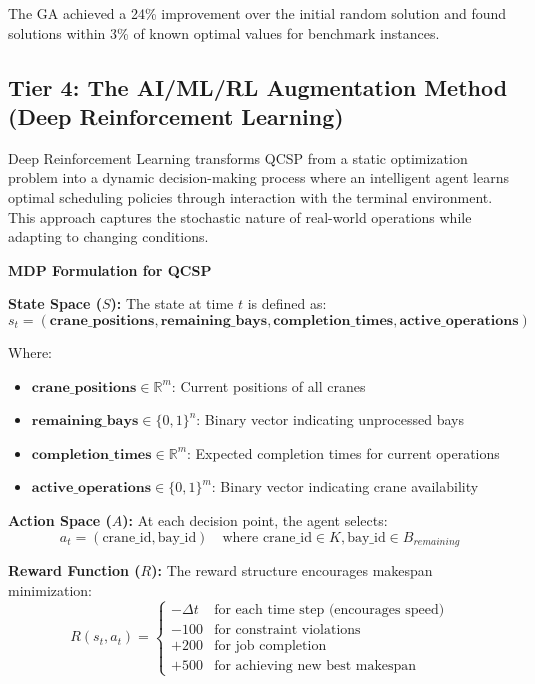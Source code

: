 \documentclass{article}
\begin{document}
The GA achieved a 24\% improvement over the initial random solution and found solutions within 3\% of known optimal values for benchmark instances.

\subsection{Tier 4: The AI/ML/RL Augmentation Method (Deep Reinforcement Learning)}

Deep Reinforcement Learning transforms QCSP from a static optimization problem into a dynamic decision-making process where an intelligent agent learns optimal scheduling policies through interaction with the terminal environment. This approach captures the stochastic nature of real-world operations while adapting to changing conditions.

\textbf{MDP Formulation for QCSP}

\textbf{State Space ($S$):} The state at time $t$ is defined as:
\begin{equation}
s_t = (\mathbf{crane\_positions}, \mathbf{remaining\_bays}, \mathbf{completion\_times}, \mathbf{active\_operations})
\end{equation}

Where:
\begin{itemize}
\item $\mathbf{crane\_positions} \in \mathbb{R}^m$: Current positions of all cranes
\item $\mathbf{remaining\_bays} \in \{0,1\}^n$: Binary vector indicating unprocessed bays
\item $\mathbf{completion\_times} \in \mathbb{R}^m$: Expected completion times for current operations
\item $\mathbf{active\_operations} \in \{0,1\}^m$: Binary vector indicating crane availability
\end{itemize}

\textbf{Action Space ($A$):} At each decision point, the agent selects:
\begin{equation}
a_t = (\text{crane\_id}, \text{bay\_id}) \quad \text{where crane\_id} \in K, \text{bay\_id} \in B_{remaining}
\end{equation}

\textbf{Reward Function ($R$):} The reward structure encourages makespan minimization:
\begin{equation}
R(s_t, a_t) = \begin{cases}
-\Delta t & \text{for each time step (encourages speed)} \\
-100 & \text{for constraint violations} \\
+200 & \text{for job completion} \\
+500 & \text{for achieving new best makespan}
\end{cases}
\end{equation}
\end{document}
